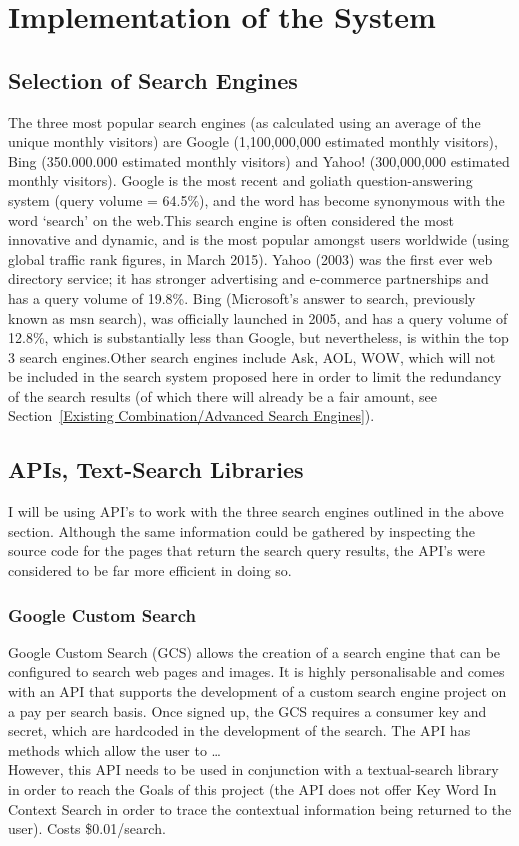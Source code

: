 \documentclass[10pt]{article}
\begin{document}
\section{Implementation of the System}\label{api}
\subsection{Selection of Search Engines}
The three most popular search engines (as calculated using an average of the unique monthly visitors) are Google (1,100,000,000 estimated monthly visitors), Bing (350.000.000 estimated monthly visitors) and Yahoo! (300,000,000 estimated monthly visitors)\cite{ebiz}. Google is the most recent and goliath question-answering system (query volume = 64.5\%)\cite{adam}, and the word has become synonymous with the word ‘search’ on the web.This search engine is often considered the most innovative and dynamic, and is the most popular amongst users worldwide (using global traffic rank figures, in March 2015). Yahoo (2003) was the first ever web directory service; it has stronger advertising and e-commerce partnerships and has a query volume of 19.8\%. Bing (Microsoft’s answer to search, previously known as msn search), was officially launched in 2005, and has a query volume of 12.8\%, which is substantially less than Google, but nevertheless, is within the top 3 search engines.Other search engines include Ask, AOL, WOW, which will not be included in the search system proposed here in order to limit the redundancy of the search results (of which there will already be a fair amount, see Section~\ref{Existing Combination/Advanced Search Engines}). 

\subsection{APIs, Text-Search Libraries}
I will be using API’s to work with the three search engines outlined in the above section. Although the same information could be gathered by inspecting the source code for the pages that return the search query results, the API’s were considered to be far more efficient in doing so. 

\subsubsection{Google Custom Search}
Google Custom Search (GCS) allows the creation of a search engine that can be configured to search web pages and images. It is highly personalisable and comes with an API that supports the development of a custom search engine project on a pay per search basis. Once signed up, the GCS requires a consumer key and secret, which are hardcoded in the development of the search.
The API has methods which allow the user to …\\
However, this API needs to be used in conjunction with a textual-search library in order to reach the Goals of this project (the API does not offer Key Word In Context Search in order to trace the contextual information being returned to the user). Costs \$0.01/search.
\end{document}
